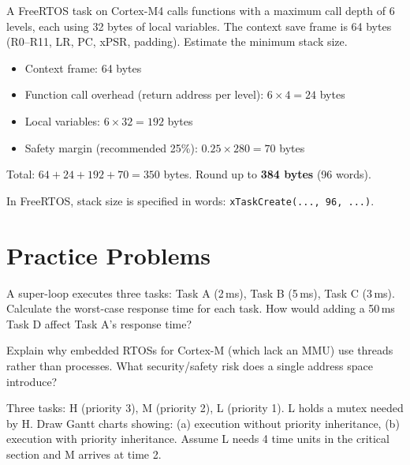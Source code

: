 \begin{example}
A FreeRTOS task on Cortex-M4 calls functions with a maximum call depth of 6 levels, each using 32 bytes of local variables. The context save frame is 64 bytes (R0--R11, LR, PC, xPSR, padding). Estimate the minimum stack size.

\begin{solution}
\begin{itemize}[nosep]
  \item Context frame: 64 bytes
  \item Function call overhead (return address per level): $6 \times 4 = 24$ bytes
  \item Local variables: $6 \times 32 = 192$ bytes
  \item Safety margin (recommended 25\%): $0.25 \times 280 = 70$ bytes
\end{itemize}

Total: $64 + 24 + 192 + 70 = 350$ bytes. Round up to \textbf{384 bytes} (96 words).

In FreeRTOS, stack size is specified in words: \texttt{xTaskCreate(..., 96, ...)}.
\end{solution}
\end{example}

\section{Practice Problems}
\label{sec:mt:practice}

\begin{exercise}
A super-loop executes three tasks: Task A (2\,ms), Task B (5\,ms), Task C (3\,ms). Calculate the worst-case response time for each task. How would adding a 50\,ms Task D affect Task A's response time?
\end{exercise}

\begin{exercise}
Explain why embedded RTOSs for Cortex-M (which lack an MMU) use threads rather than processes. What security/safety risk does a single address space introduce?
\end{exercise}

\begin{exercise}
Three tasks: H (priority 3), M (priority 2), L (priority 1). L holds a mutex needed by H. Draw Gantt charts showing: (a) execution without priority inheritance, (b) execution with priority inheritance. Assume L needs 4 time units in the critical section and M arrives at time 2.
\end{exercise}

